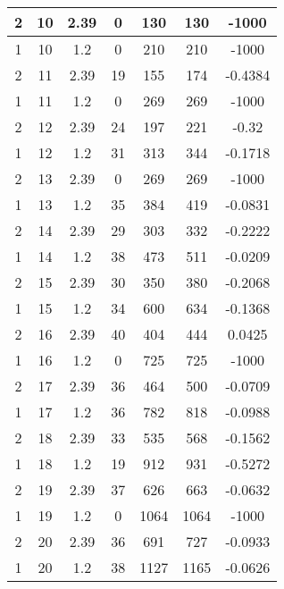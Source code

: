 \documentclass[letterpaper, 12pt]{article}
\begin{document}
\begin{longtable}{|c|c|c|c|c|c|c|}
\hline
2 & 10 & 2.39 & 0 & 130 & 130 & -1000 \\
\hline
1 & 10 & 1.2 & 0 & 210 & 210 & -1000 \\
\hline
2 & 11 & 2.39 & 19 & 155 & 174 & -0.4384 \\
\hline
1 & 11 & 1.2 & 0 & 269 & 269 & -1000 \\
\hline
2 & 12 & 2.39 & 24 & 197 & 221 & -0.32 \\
\hline
1 & 12 & 1.2 & 31 & 313 & 344 & -0.1718 \\
\hline
2 & 13 & 2.39 & 0 & 269 & 269 & -1000 \\
\hline
1 & 13 & 1.2 & 35 & 384 & 419 & -0.0831 \\
\hline
2 & 14 & 2.39 & 29 & 303 & 332 & -0.2222 \\
\hline
1 & 14 & 1.2 & 38 & 473 & 511 & -0.0209 \\
\hline
2 & 15 & 2.39 & 30 & 350 & 380 & -0.2068 \\
\hline
1 & 15 & 1.2 & 34 & 600 & 634 & -0.1368 \\
\hline
2 & 16 & 2.39 & 40 & 404 & 444 & 0.0425 \\
\hline
1 & 16 & 1.2 & 0 & 725 & 725 & -1000 \\
\hline
2 & 17 & 2.39 & 36 & 464 & 500 & -0.0709 \\
\hline
1 & 17 & 1.2 & 36 & 782 & 818 & -0.0988 \\
\hline
2 & 18 & 2.39 & 33 & 535 & 568 & -0.1562 \\
\hline
1 & 18 & 1.2 & 19 & 912 & 931 & -0.5272 \\
\hline
2 & 19 & 2.39 & 37 & 626 & 663 & -0.0632 \\
\hline
1 & 19 & 1.2 & 0 & 1064 & 1064 & -1000 \\
\hline
2 & 20 & 2.39 & 36 & 691 & 727 & -0.0933 \\
\hline
1 & 20 & 1.2 & 38 & 1127 & 1165 & -0.0626 \\
\hline
\end{longtable}
\end{document}
